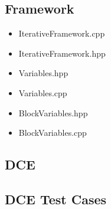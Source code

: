 \subsection{Framework}

\begin{itemize}
   \item IterativeFramework.cpp

   {\tiny }
   
   \item IterativeFramework.hpp
   
   {\tiny }
   
   \item Variables.hpp
   
   {\tiny }
   
   \item Variables.cpp
   
   {\tiny }

   \item BlockVariables.hpp

   {\tiny }

   \item BlockVariables.cpp

   {\tiny }

   
\end{itemize}

\subsection{DCE}

{\tiny }

\subsection{DCE Test Cases}

